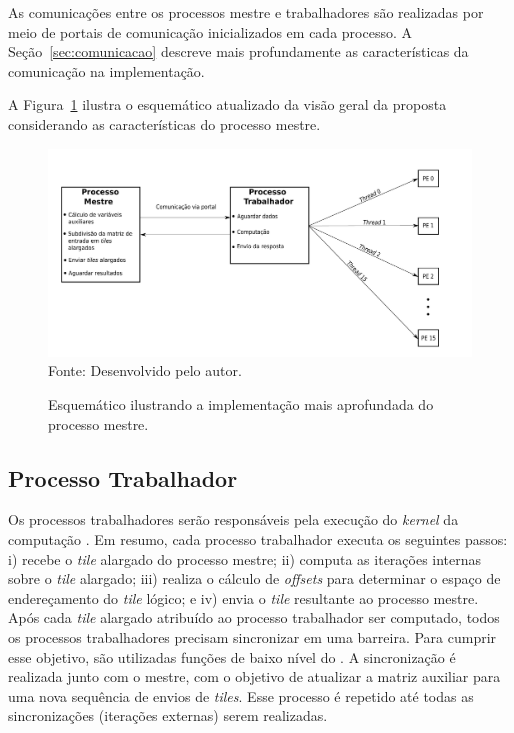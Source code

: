 As comunicações entre os processos mestre e trabalhadores são realizadas por
meio de portais de comunicação inicializados em cada processo. A
Seção~\ref{sec:comunicacao} descreve mais profundamente as características da
comunicação na implementação.

A Figura~\ref{fig:visaoGeralMestre} ilustra o esquemático atualizado da visão geral
da proposta considerando as características do processo mestre.


\begin{figure}[!h]
	\centering
    \caption{Esquemático ilustrando a implementação mais aprofundada do processo mestre.}
    \includegraphics[width=\textwidth, height=!]{figs/visaoGeralPSKELMPPAMestre.pdf} \\
    Fonte: Desenvolvido pelo autor.
    \label{fig:visaoGeralMestre}
\end{figure}



\subsection{Processo Trabalhador}
Os processos trabalhadores serão responsáveis pela
execução do \textit{kernel} da computação \stencil. Em resumo, cada processo
trabalhador executa os seguintes passos: i) recebe o \textit{tile} alargado do processo mestre;
ii) computa as iterações internas sobre o \textit{tile} alargado; iii) realiza o
cálculo de \textit{offsets} para determinar o espaço de endereçamento do
\textit{tile} lógico; e iv) envia o \textit{tile} resultante ao processo mestre. Após cada \textit{tile}
alargado atribuído ao processo trabalhador ser computado, todos os processos
trabalhadores precisam sincronizar em uma barreira. Para cumprir esse objetivo,
são utilizadas funções de baixo nível do \mppa. A sincronização é realizada
junto com o mestre, com o objetivo de atualizar a matriz auxiliar para uma nova
sequência de envios de \textit{tiles}. Esse processo é repetido até
todas as sincronizações (iterações externas) serem realizadas.

